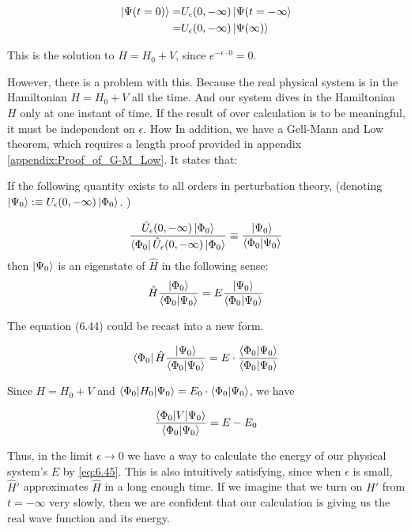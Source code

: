 \documentclass{article}
\numberwithin{equation}{subsection} %
\begin{document}
    \begin{align}
        \ket{\Psi(t=0)} =& U_\epsilon (0,-\infty) \ket{\Psi(t=-\infty}
        \\
        =& U_\epsilon (0,-\infty) \ket{\Psi(\infty)}
    \end{align}
    
    This is the solution to $H=H_0+V$, since $e^{-\epsilon \cdot 0}=0$.
    
    
    However, there is a problem with this. Because the real physical system is in the Hamiltonian $H=H_0+V$ all the time. And our system dives in the Hamiltonian $H$ only at one instant of time. If the result of over calculation is to be meaningful, it must be independent on $\epsilon$.
    How
    In addition, we have a Gell-Mann and Low theorem, which requires a length proof provided in appendix \ref{appendix:Proof_of_G-M_Low}. It states that:
    
    If the following quantity exists to all orders in perturbation theory, (denoting $\ket{\Psi_0} :\equiv U_{\epsilon} (0, -\infty) \ket{\Phi_0}$. )
    
    	$$ \frac{\hat{U}_\epsilon(0,-\infty)\ket{\Phi_0}}{\bra{\Phi_0}\hat{U}_\epsilon(0,-\infty)\ket{\Phi_0}}
    	\equiv
    	\frac{\ket{\Psi_0}}{\braket{\Phi_0|\Psi_0}}
    	$$
    	then $\ket{\Psi_0}$ is an eigenstate of $\hat{H}$ in the following sense:
    	$$\hat{H}\frac{\ket{\Phi_0}}{\braket{\Phi_0|\Psi_0}}
    	=
    	E \frac{\ket{\Psi_0}}{\braket{\Phi_0 |\Psi_0}}
    	$$
    
    
    The equation (6.44) could be recast into a new form.
    
    $$\bra{\Phi_0} \hat{H} \frac{\ket{\Psi_0}}{\braket{\Phi_0|\Psi_0}}
    = E \cdot \frac{\braket{\Phi_0|\Psi_0}}{\braket{\Phi_0|\Psi_0}}
    $$
    
    Since $H=H_0+V$ and $\braket{\Phi_0|H_0|\Psi_0} = E_0 \cdot {\braket{\Phi_0|\Psi_0}}$, we have
    
    \begin{align} \frac{\braket{\Phi_0|V|\Psi_0}}{\braket{\Phi_0|\Psi_0}}= E-E_0   \label{eq:6.45}
    \end{align}
    
    Thus, in the limit $\epsilon \rightarrow 0$ we have a way to calculate the energy of our physical system's $E$ by \ref{eq:6.45}. This is also intuitively satisfying, since when $\epsilon$ is small, $\hat{H}'$ approximates $\hat{H}$ in a long enough time. If we imagine that we turn on $H'$ from $t=-\infty$ very slowly, then we are confident that our calculation is giving us the real wave function and its energy.
    
\end{document}
